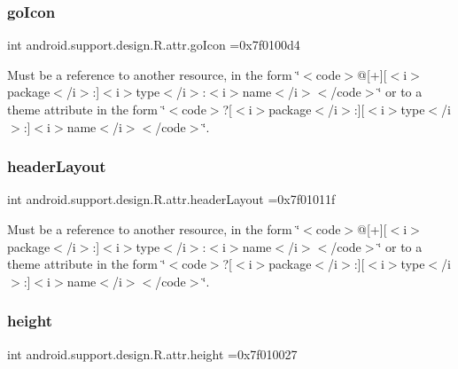 \subsubsection{\texorpdfstring{go\+Icon}{goIcon}}
{\footnotesize\ttfamily int android.\+support.\+design.\+R.\+attr.\+go\+Icon =0x7f0100d4\hspace{0.3cm}{\ttfamily [static]}}

Must be a reference to another resource, in the form \char`\"{}$<$code$>$@\mbox{[}+\mbox{]}\mbox{[}$<$i$>$package$<$/i$>$\+:\mbox{]}$<$i$>$type$<$/i$>$\+:$<$i$>$name$<$/i$>$$<$/code$>$\char`\"{} or to a theme attribute in the form \char`\"{}$<$code$>$?\mbox{[}$<$i$>$package$<$/i$>$\+:\mbox{]}\mbox{[}$<$i$>$type$<$/i$>$\+:\mbox{]}$<$i$>$name$<$/i$>$$<$/code$>$\char`\"{}. \mbox{\label{classandroid_1_1support_1_1design_1_1R_1_1attr_a49a77c4653b1f3d4066e9f8f6fe5cb65}} 
\subsubsection{\texorpdfstring{header\+Layout}{headerLayout}}
{\footnotesize\ttfamily int android.\+support.\+design.\+R.\+attr.\+header\+Layout =0x7f01011f\hspace{0.3cm}{\ttfamily [static]}}

Must be a reference to another resource, in the form \char`\"{}$<$code$>$@\mbox{[}+\mbox{]}\mbox{[}$<$i$>$package$<$/i$>$\+:\mbox{]}$<$i$>$type$<$/i$>$\+:$<$i$>$name$<$/i$>$$<$/code$>$\char`\"{} or to a theme attribute in the form \char`\"{}$<$code$>$?\mbox{[}$<$i$>$package$<$/i$>$\+:\mbox{]}\mbox{[}$<$i$>$type$<$/i$>$\+:\mbox{]}$<$i$>$name$<$/i$>$$<$/code$>$\char`\"{}. \mbox{\label{classandroid_1_1support_1_1design_1_1R_1_1attr_a9f0ba1ff755eae97d0aaf956a1f3438b}} 
\subsubsection{\texorpdfstring{height}{height}}
{\footnotesize\ttfamily int android.\+support.\+design.\+R.\+attr.\+height =0x7f010027\hspace{0.3cm}{\ttfamily [static]}}

